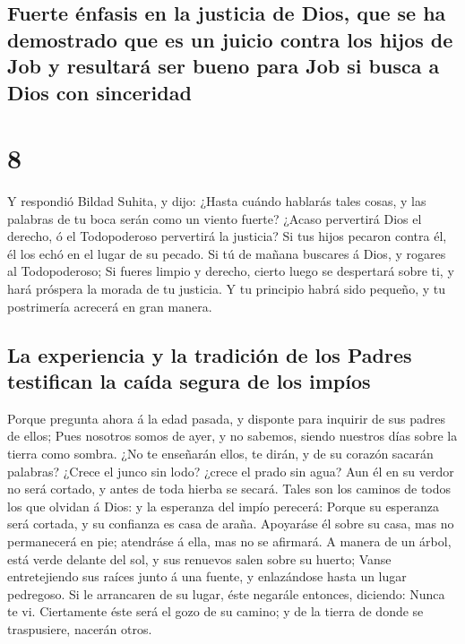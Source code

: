 \hypertarget{fuerte-uxe9nfasis-en-la-justicia-de-dios-que-se-ha-demostrado-que-es-un-juicio-contra-los-hijos-de-job-y-resultaruxe1-ser-bueno-para-job-si-busca-a-dios-con-sinceridad}{%
\subsection{Fuerte énfasis en la justicia de Dios, que se ha demostrado
que es un juicio contra los hijos de Job y resultará ser bueno para Job
si busca a Dios con
sinceridad}\label{fuerte-uxe9nfasis-en-la-justicia-de-dios-que-se-ha-demostrado-que-es-un-juicio-contra-los-hijos-de-job-y-resultaruxe1-ser-bueno-para-job-si-busca-a-dios-con-sinceridad}}

\hypertarget{section-18-8}{%
\section{8}\label{section-18-8}}

 Y respondió Bildad Suhita, y dijo:  ¿Hasta
cuándo hablarás tales cosas, y las palabras de tu boca serán como un
viento fuerte?  ¿Acaso pervertirá Dios el derecho, ó el
Todopoderoso pervertirá la justicia?  Si tus hijos pecaron
contra él, él los echó en el lugar de su pecado.  Si tú de
mañana buscares á Dios, y rogares al Todopoderoso;  Si
fueres limpio y derecho, cierto luego se despertará sobre ti, y hará
próspera la morada de tu justicia.  Y tu principio habrá
sido pequeño, y tu postrimería acrecerá en gran manera.

\hypertarget{la-experiencia-y-la-tradiciuxf3n-de-los-padres-testifican-la-cauxedda-segura-de-los-impuxedos}{%
\subsection{La experiencia y la tradición de los Padres testifican la
caída segura de los
impíos}\label{la-experiencia-y-la-tradiciuxf3n-de-los-padres-testifican-la-cauxedda-segura-de-los-impuxedos}}

 Porque pregunta ahora á la edad pasada, y disponte para
inquirir de sus padres de ellos;  Pues nosotros somos de
ayer, y no sabemos, siendo nuestros días sobre la tierra como sombra.
 ¿No te enseñarán ellos, te dirán, y de su corazón
sacarán palabras?  ¿Crece el junco sin lodo? ¿crece el
prado sin agua?  Aun él en su verdor no será cortado, y
antes de toda hierba se secará.  Tales son los caminos de
todos los que olvidan á Dios: y la esperanza del impío perecerá:
 Porque su esperanza será cortada, y su confianza es casa
de araña.  Apoyaráse él sobre su casa, mas no permanecerá
en pie; atendráse á ella, mas no se afirmará.  A manera
de un árbol, está verde delante del sol, y sus renuevos salen sobre su
huerto;  Vanse entretejiendo sus raíces junto á una
fuente, y enlazándose hasta un lugar pedregoso.  Si le
arrancaren de su lugar, éste negarále entonces, diciendo: Nunca te vi.
 Ciertamente éste será el gozo de su camino; y de la
tierra de donde se traspusiere, nacerán otros.


